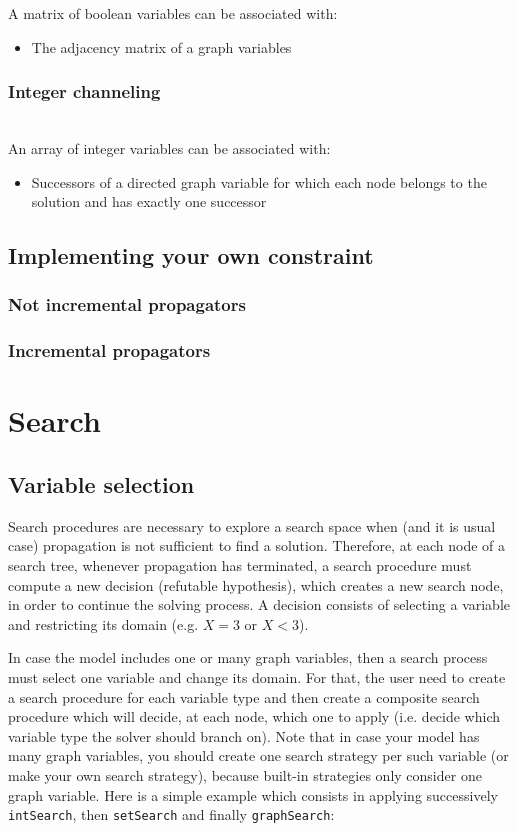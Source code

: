 \documentclass{article}
\begin{document}
A matrix of boolean variables can be associated with: 
\begin{itemize}
\item The adjacency matrix of a graph variables
\end{itemize}

\subsubsection{Integer channeling}~\\

An array of integer variables can be associated with: 
\begin{itemize}
\item Successors of a directed graph variable for which each node belongs to the solution and has exactly one successor
\end{itemize}


\subsection{Implementing your own constraint}
\subsubsection{Not incremental propagators}
\subsubsection{Incremental propagators}

\newpage{}
\section{Search}

\subsection{Variable selection}

Search procedures are necessary to explore a search space when (and it is usual case) propagation is not sufficient to find a solution. 
Therefore, at each node of a search tree, whenever propagation has terminated, a search procedure must compute a new decision (refutable hypothesis), which creates a new search node, in order to continue the solving process. A decision consists of selecting a variable and restricting its domain (e.g. $X=3$ or $X<3$). 

In case the model includes one or many graph variables, then a search process must select one variable and change its domain. 
For that, the user need to create a search procedure for each variable type and then create a composite search procedure which will decide, at each node, which one to apply (i.e. decide which variable type the solver should branch on). Note that in case your model has many graph variables, you should create one search strategy per such variable (or make your own search strategy), because built-in strategies only consider one graph variable. Here is a simple example which consists in applying successively \texttt{intSearch}, then \texttt{setSearch} and finally \texttt{graphSearch}:
\end{document}
